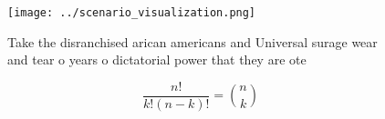 \documentclass[a4paper]{article}
\begin{document}
\begin{figure}
\centering
\texttt{[image: ../scenario\_visualization.png]}
\caption{Take the disranchised arican americans and Universal surage wear and tear o years o dictatorial power that they are ote
}
\end{figure}
 
\[ \frac{n!}{k!(n-k)!} = \binom{n}{k} \]
\end{document}

